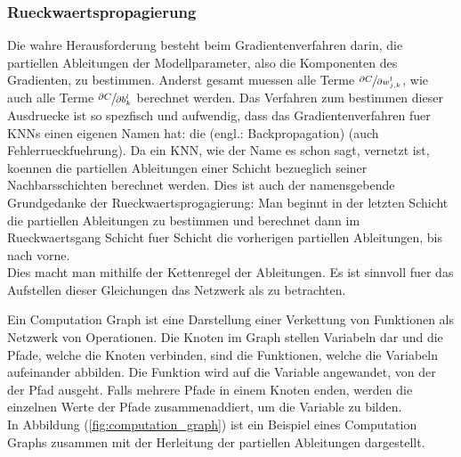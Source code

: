 \documentclass[../main]{subfiles}
\begin{document}
\subsubsection{Rueckwaertspropagierung}\label{sec:backpropagation}
Die wahre Herausforderung besteht beim Gradientenverfahren darin,
die partiellen Ableitungen der Modellparameter,
also die Komponenten des Gradienten, zu bestimmen.
Anderst gesamt muessen alle Terme
$\sfrac{\partial C}{\partial w_{j,k}^l}$, wie auch alle Terme $\sfrac{\partial C}{\partial b_k^l}$
berechnet werden.
Das Verfahren zum bestimmen dieser Ausdruecke ist so spezfisch und aufwendig,
dass das Gradientenverfahren fuer KNNs einen eigenen Namen hat: die
 (engl.: Backpropagation) (auch Fehlerrueckfuehrung).
\para{}
Da ein KNN, wie der Name es schon sagt, vernetzt ist, koennen die partiellen
Ableitungen einer Schicht bezueglich seiner Nachbarsschichten berechnet werden.
Dies ist auch der namensgebende Grundgedanke der Rueckwaertsprogagierung: Man
beginnt in der letzten Schicht die partiellen Ableitungen zu bestimmen und
berechnet dann im Rueckwaertsgang Schicht fuer Schicht die vorherigen
partiellen Ableitungen, bis nach vorne. \\
Dies macht man mithilfe der Kettenregel der Ableitungen.
Es ist sinnvoll fuer das Aufstellen dieser Gleichungen das Netzwerk als
 zu betrachten.
\para{}

Ein Computation Graph ist eine Darstellung einer Verkettung von Funktionen als Netzwerk von Operationen.
Die Knoten im Graph stellen Variabeln dar und die Pfade, welche die Knoten
verbinden, sind die Funktionen, welche die Variabeln aufeinander abbilden. Die
Funktion wird auf die Variable angewandet, von der der Pfad ausgeht. Falls
mehrere Pfade in einem Knoten enden, werden die einzelnen Werte der Pfade
zusammenaddiert, um die Variable zu bilden. \\
In Abbildung (\ref{fig:computation_graph}) ist ein Beispiel eines Computation
Graphs zusammen mit der Herleitung der partiellen Ableitungen dargestellt.
\end{document}
